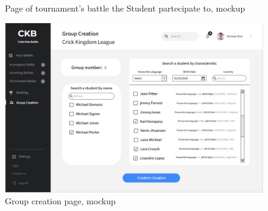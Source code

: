 \documentclass{article}
\begin{document}
{\begin{figure}[H]
    \caption{Page of tournament's battle the Student partecipate to, mockup}
    \label{fig:studentBattlesPageMockup}
\end{figure}
\begin{figure}[H]
    \centering
    \hspace*{-0.2cm}\includegraphics[scale=0.52]{UserInterface/GroupCreation.png}
    \caption{Group creation page, mockup}
    \label{fig:groupCreationPageMockup}
\end{figure}




\newpage
\pagestyle{RequirementsTraceabilityStyle}
}
\end{document}
